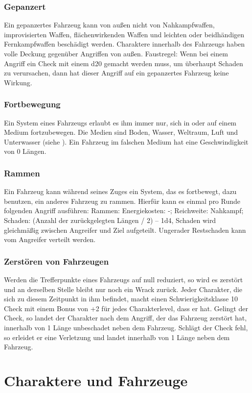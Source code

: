 \subsubsection{Gepanzert}
Ein gepanzertes Fahrzeug kann von außen nicht von Nahkampfwaffen, improvisierten Waffen, flächenwirkenden Waffen und leichten oder beidhändigen Fernkampfwaffen beschädigt werden. Charaktere innerhalb des Fahrzeugs haben volle Deckung gegenüber Angriffen von außen.
Faustregel: Wenn bei einem Angriff ein Check mit einem d20 gemacht werden muss, um überhaupt Schaden zu verursachen, dann hat dieser Angriff auf ein gepanzertes Fahrzeug keine Wirkung.
\subsubsection{Fortbewegung}
Ein System eines Fahrzeugs erlaubt es ihm immer nur, sich in oder auf einem Medium fortzubewegen. Die Medien sind Boden, Wasser, Weltraum, Luft und Unterwasser (siehe ).
Ein Fahrzeug im falschen Medium hat eine Geschwindigkeit von 0 Längen.
\subsubsection{Rammen}
Ein Fahrzeug kann während seines Zuges ein System, das es fortbewegt, dazu benutzen, ein anderes Fahrzeug zu rammen. Hierfür kann es einmal pro Runde folgenden Angriff ausführen:
Rammen: Energiekosten: -; Reichweite: Nahkampf;
Schaden: (Anzahl der zurückgelegten Längen / 2) – 1d4, Schaden wird gleichmäßig zwischen Angreifer und Ziel aufgeteilt. Ungerader Restschaden kann vom Angreifer verteilt werden.
\subsubsection{Zerstören von Fahrzeugen}
Werden die Trefferpunkte eines Fahrzeugs auf null reduziert, so wird es zerstört und an derselben Stelle bleibt nur noch ein Wrack zurück. Jeder Charakter, die sich zu diesem Zeitpunkt in ihm befindet, macht einen Schwierigkeitsklasse 10 Check mit einem Bonus von +2 für jedes Charakterlevel, dass er hat. Gelingt der Check, so landet der Charakter nach dem Angriff, der das Fahrzeug zerstört hat, innerhalb von 1 Länge unbeschadet neben dem Fahrzeug. Schlägt der Check fehl, so erleidet er eine Verletzung und landet innerhalb von 1 Länge neben dem Fahrzeug.
\section{Charaktere und Fahrzeuge}
